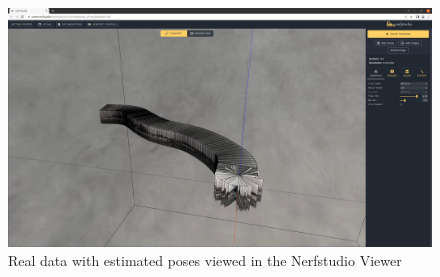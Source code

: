 \begin{figure}[!h]
    \centering
    \includegraphics[width=1.0\textwidth]{figures/nerfstudio_real_data_estimated_poses.png}
    \caption{Real data with estimated poses viewed in the Nerfstudio Viewer}
    \label{fig:nerfstudio_real_data_estimated_poses}
\end{figure}
